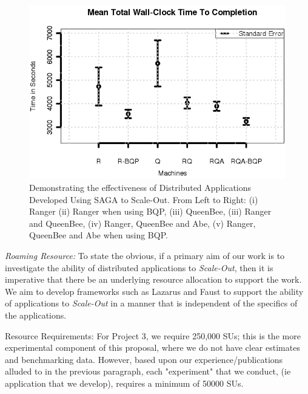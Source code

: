 \documentclass[a4paper,10pt]{article}
\begin{document}
\begin{figure}
\begin{center}
\includegraphics[scale=0.8]{Figure7.png}
\end{center}
\caption{Demonstrating the effectiveness of Distributed Applications Developed  Using SAGA to Scale-Out. From Left to Right: (i)
  Ranger (ii) Ranger when using BQP, (iii) QueenBee, (iii) Ranger
  and QueenBee, (iv) Ranger, QueenBee and Abe, (v) Ranger, QueenBee 
  and Abe when using BQP.}
\label{fig:results}
\end{figure}



{\it Roaming Resource:} To state the obvious, if a primary aim of our work is to investigate the ability of distributed applications to {\it Scale-Out}, then it is imperative that there be an underlying resource allocation to support the work. We aim to develop frameworks such as Lazarus and Faust to support the ability of applications to {\it Scale-Out} in a manner that is independent of the specifics of the applications.


Resource Requirements: For Project 3, we require 250,000 SUs; this is the more experimental component of this proposal, where we do not have clear estimates and benchmarking data. However, based upon our experience/publications alluded to in the previous paragraph, each "experiment" that we conduct, (ie application that we develop), requires a minimum of 50000 SUs.
\end{document}
